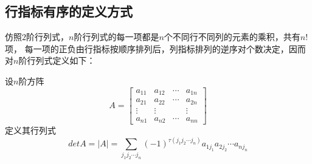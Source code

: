 \subsection{行指标有序的定义方式}
仿照$2$阶行列式，$n$阶行列式的每一项都是$n$个不同行不同列的元素的乘积，共有$n!$项，
每一项的正负由行指标按顺序排列后，列指标排列的逆序对个数决定，因而对$n$阶行列式定义如下：
\begin{definition}
    设$n$阶方阵
    \begin{equation*}
        A = \begin{bmatrix}
            a_{11} & a_{12} & \cdots & a_{1n}\\
            a_{21} & a_{22} & \cdots & a_{2n}\\
            \vdots & \vdots &        & \vdots\\
            a_{n1} & a_{n2} & \cdots & a_{nn}
        \end{bmatrix}
    \end{equation*}
    定义其行列式
    \begin{equation*}
        det A = |A| = \sum_{j_{1}j_{2}\cdots j_{n}}^{} (-1)^{\tau (j_{1}j_{2}\cdots j_{n})}a_{1j_{1}}a_{2j_{2}}\cdots a_{nj_{n}}
    \end{equation*}
\end{definition}

